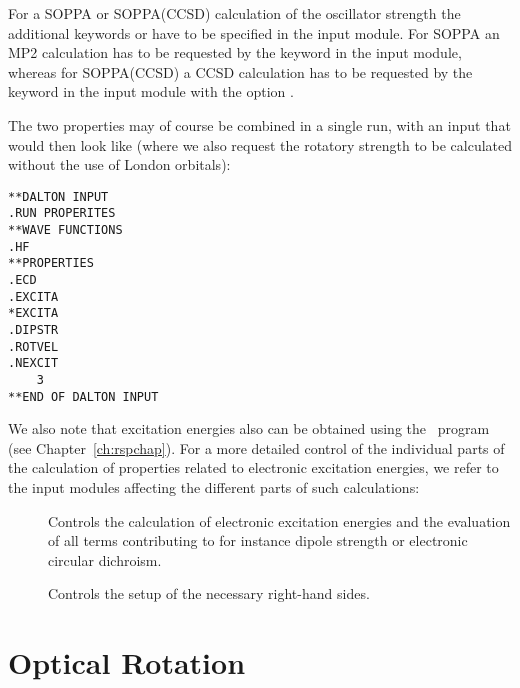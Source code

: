 For a SOPPA or SOPPA(CCSD) calculation of
the oscillator strength the additional keywords  or
 have to be specified in the  input
module. For SOPPA an MP2 calculation has to be requested by the keyword
 in the  input module, whereas for SOPPA(CCSD) a
CCSD calculation has to be requested by the keyword  in the  input module with the  option
.

The two properties may of course be combined in a single run, with an
input that would then look like (where we also request the rotatory
strength to be calculated without the use of London orbitals):

\begin{verbatim}
**DALTON INPUT
.RUN PROPERITES
**WAVE FUNCTIONS
.HF
**PROPERTIES
.ECD
.EXCITA
*EXCITA
.DIPSTR
.ROTVEL
.NEXCIT
    3
**END OF DALTON INPUT
\end{verbatim}

We also note that excitation energies also can be obtained using the
\resp\ program (see Chapter~\ref{ch:rspchap}).
For a more detailed control of the individual parts of the 
calculation of properties related to electronic excitation energies,
we refer to the input modules affecting the different parts of such
calculations:

\begin{description}
\item[] Controls the calculation of electronic excitation
energies and the evaluation of all terms contributing to for instance
dipole strength or electronic circular dichroism.

\item[] Controls the setup of the necessary right-hand
sides.
\end{description}

\section{Optical Rotation}\label{sec:optrot}

\begin{center}
\end{center}

